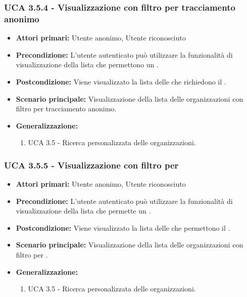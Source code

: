 \subsubsection{UCA 3.5.4 - Visualizzazione con filtro per tracciamento anonimo}%
\begin{itemize}
	\item \textbf{Attori primari:} Utente anonimo, Utente riconosciuto
	\item \textbf{Precondizione:} L'utente autenticato può utilizzare la funzionalità di visualizzazione della lista che permettono un .
	\item \textbf{Postcondizione:} Viene visualizzato la lista delle  che richiedono il .
	\item \textbf{Scenario principale:} Visualizzazione della lista delle organizzazioni con filtro per tracciamento anonimo.
	\item \textbf{Generalizzazione:}
	\begin{enumerate}
	\item UCA 3.5 - Ricerca personalizzata delle organizzazioni.
	\end{enumerate}	
\end{itemize}

\subsubsection{UCA 3.5.5 - Visualizzazione con filtro per }%
\begin{itemize}
	\item \textbf{Attori primari:} Utente anonimo, Utente riconosciuto
	\item \textbf{Precondizione:} L'utente autenticato può utilizzare la funzionalità di visualizzazione della lista che permette un .
	\item \textbf{Postcondizione:} Viene visualizzato la lista delle  che permettono il .
	\item \textbf{Scenario principale:} Visualizzazione della lista delle organizzazioni con filtro per .
	\item \textbf{Generalizzazione:}
	\begin{enumerate}
	\item UCA 3.5 - Ricerca personalizzata delle organizzazioni.
	\end{enumerate}	
\end{itemize}